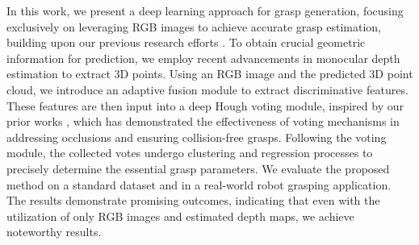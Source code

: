 In this work, we present a deep learning approach for grasp generation, focusing exclusively on leveraging RGB images to achieve accurate grasp estimation, building upon our previous research efforts \cite{hoang2023grasp, hoang2022context}. To obtain crucial geometric information for prediction, we employ recent advancements in monocular depth estimation to extract 3D points. Using an RGB image and the predicted 3D point cloud, we introduce an adaptive fusion module to extract discriminative features. These features are then input into a deep Hough voting module, inspired by our prior works \cite{hoang2023grasp, hoang2022context}, which has demonstrated the effectiveness of voting mechanisms in addressing occlusions and ensuring collision-free grasps. Following the voting module, the collected votes undergo clustering and regression processes to precisely determine the essential grasp parameters. We evaluate the proposed method on a standard dataset and in a real-world robot grasping application. The results demonstrate promising outcomes, indicating that even with the utilization of only RGB images and estimated depth maps, we achieve noteworthy results.